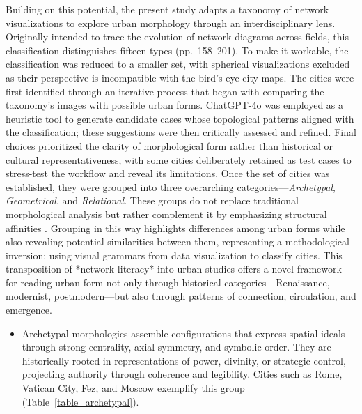 \documentclass[land,article,accept,pdftex,oneauthor]{Definitions/mdpi}
\begin{document}
{Building on this potential, the present study adapts a taxonomy of network visualizations to explore urban morphology through an interdisciplinary lens. Originally intended to trace the evolution of network diagrams across fields, this classification distinguishes fifteen types \cite{lima_visual_2011}  {(pp.~158--201).}  %
To make it workable, the classification was reduced to a smaller set, with spherical visualizations excluded as their perspective is incompatible with the bird’s-eye city maps. The cities were first identified through an iterative process that began with comparing the taxonomy’s images with possible urban forms. ChatGPT-4o was employed as a heuristic tool to generate candidate cases whose topological patterns aligned with the classification; these suggestions were then critically assessed and refined. Final choices prioritized the clarity of morphological form rather than historical or cultural representativeness, with some cities deliberately retained as test cases to stress-test the workflow and reveal its limitations. Once the set of cities was established, they were grouped into three overarching categories---\textit{Archetypal}, \textit{Geometrical}, and \textit{Relational}. These groups do not replace traditional morphological analysis \cite{lynch_image_1960} but rather complement it by emphasizing structural affinities \cite{rodighiero_mapping_2021}. Grouping in this way highlights differences among urban forms while also revealing potential similarities between them, representing a methodological inversion: using visual grammars from data visualization to classify cities. This transposition of *network literacy* into urban studies offers a novel framework for reading urban form not only through historical categories---Renaissance, modernist, postmodern---but also through patterns of connection, circulation, and emergence.

\begin{itemize}
    \item {Archetypal} %
 morphologies assemble configurations that express spatial ideals through strong centrality, axial symmetry, and symbolic order. They are historically rooted in representations of power, divinity, or strategic control, projecting authority through coherence and legibility. Cities such as Rome, Vatican City, Fez, and Moscow exemplify this group (Table~\ref{table_archetypal}).  


\end{itemize}}
\end{document}
